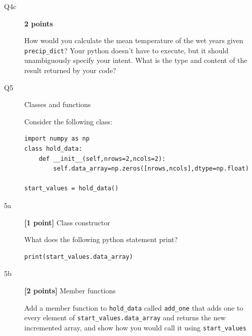 \documentclass{article}
\begin{document}
\begin{description}
\vspace{2cm}

\item[Q4c]\textbf{2 points}

  How would you calculate the mean temperature of the wet years given \verb+precip_dict+?
  Your python doesn't have to execute, but it should unambiguously specify your intent.  What is the type and content of the result
  returned by your code?

\newpage
\item[Q5] Classes and functions

  
Consider the following class:
  
\begin{lstlisting}
import numpy as np
class hold_data:
    def __init__(self,nrows=2,ncols=2):
        self.data_array=np.zeros([nrows,ncols],dtype=np.float)

start_values = hold_data()
\end{lstlisting}

\item[5a]\textbf{[1 point]} Class constructor

  What does the following python statement print?

\begin{verbatim}
print(start_values.data_array)
\end{verbatim}

\vspace{3cm}  
  
\item[5b]\textbf{[2 points]} Member functions

  Add a member function to \verb+hold_data+ called \verb+add_one+ that adds one to every element
  of \verb+start_values.data_array+ and returns the new incremented array,
  and show how you would call it using \verb+start_values+


\end{description}
\end{document}
